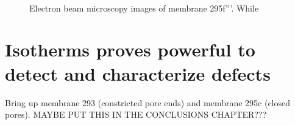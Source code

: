 \documentclass[../thesis.tex]{subfiles}
\begin{document}
            \begin{figure}[tb]
              \centering
              \hfill
              \\
              \caption{Electron beam microscopy images of membrane 295f'''. While}
              \label{fig:295f-200ALD-sem}
            \end{figure}


      \section{Isotherms proves powerful to detect and characterize defects}
      \label{sec:theory-and-defects}

      Bring up membrane 293 (constricted pore ends) and membrane 295c (closed pores).
      MAYBE PUT THIS IN THE CONCLUSIONS CHAPTER???
\end{document}
